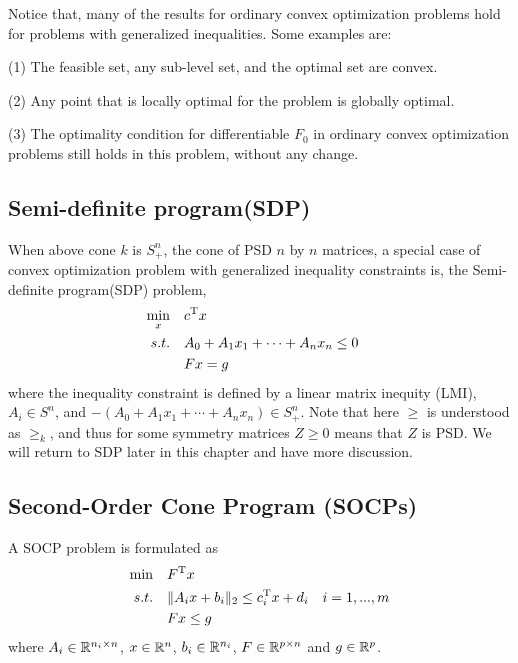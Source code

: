Notice that, many of the results for ordinary convex optimization problems hold for problems with generalized inequalities. Some examples are:

(1) The feasible set, any sub-level set, and the optimal set are convex.

(2) Any point that is locally optimal for the problem is globally optimal.

(3) The optimality condition for differentiable $F_0$ in ordinary convex optimization problems still holds in this problem, without any change.


\vspace{0.3cm}
\subsection{Semi-definite program(SDP)}
When above cone $k$ is $S^n_+$, the cone of PSD $n$ by $n$ matrices, a special case of convex optimization problem with generalized inequality constraints is, the Semi-definite program(SDP) problem,
\begin{align*}
\min_x\quad & c^{{\rm T}}x \\
s.t.\quad & A_0+A_1x_1+\cdots+A_nx_n\leq 0\quad \\
& Fx = g
\end{align*}
where the inequality constraint is defined by a linear matrix inequity (LMI), $A_i\in S^n$, and $-(A_0+A_1x_1+\cdots+A_nx_n)\in S^n_+$. Note that here $\geq$ is understood as $\geq_k$, and thus for some symmetry matrices $Z\geq 0$ means that $Z$ is PSD. We will return to SDP later in this chapter and have more discussion.









\subsection{Second-Order Cone Program (SOCPs)}
A SOCP problem is formulated as
\begin{align*}
\min \quad&F^{{\rm T}}x\\
s.t. \quad& \Vert A_ix+b_i\Vert_2 \leq c_i^{{\rm T}}x + d_i\quad i = 1,...,m\\
&Fx \leq g
\end{align*}
where $A_i\in \mathbb{R}^{n_i\times n}$, $x\in \mathbb{R}^n$, $b_i\in \mathbb{R}^{n_i}$, $F\in \mathbb{R}^{p\times n}$ and $g\in \mathbb{R}^p$.


